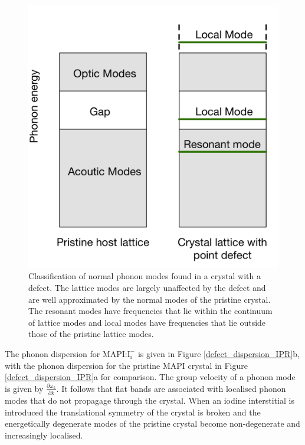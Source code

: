 \begin{figure}[h!]   
\centering
  \includegraphics[width=0.6\columnwidth]{figures/ch6/defect_modes_schematic.png}
  \caption[Classification of normal phonon modes found in a crystal with a defect]{Classification of normal phonon modes found in a crystal with a defect. The lattice modes are largely unaffected by the defect and are well approximated by the normal modes of the pristine crystal. The resonant modes have frequencies that lie within the continuum of lattice modes and local modes have frequencies that lie outside those of the pristine lattice modes.}
\label{defect_modes_schematic}
\end{figure}  %

The phonon dispersion for MAPI:$\mathrm{I}_\mathrm{i}^-$ is given in Figure \ref{defect_dispersion_IPR}b, with the phonon dispersion for the pristine MAPI crystal in Figure \ref{defect_dispersion_IPR}a for comparison.
The group velocity of a phonon mode is given by $\frac{\partial \omega_k}{\partial k}$. It follows that flat bands are associated with localised phonon modes that do not propagage through the crystal. 
When an iodine interstitial is introduced the translational symmetry of the crystal is broken and the energetically degenerate modes of the pristine crystal become non-degenerate and increasingly localised.

